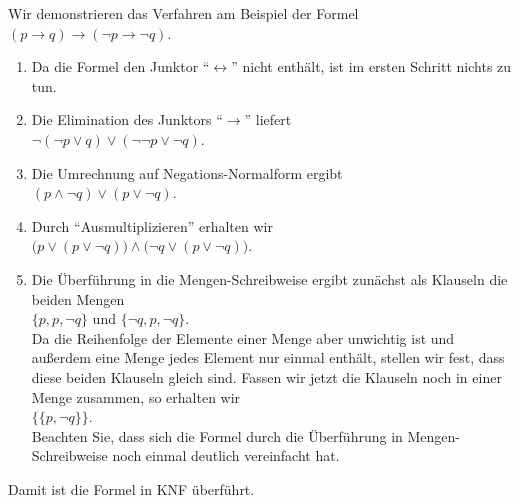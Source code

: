 Wir demonstrieren das Verfahren am Beispiel der Formel\\[0.2cm]
\hspace*{1.3cm} $(p \rightarrow q) \rightarrow (\neg p \rightarrow \neg q)$.
\begin{enumerate}
\item Da die Formel den Junktor ``$\leftrightarrow$'' nicht enthält,
      ist im ersten Schritt nichts zu tun.
\item Die Elimination des Junktors ``$\rightarrow$'' liefert \\[0.2cm]
      \hspace*{1.3cm} $\neg (\neg p \vee q) \vee (\neg \neg p \vee \neg q)$.
\item Die Umrechnung auf Negations-Normalform ergibt \\[0.2cm]
      \hspace*{1.3cm} $(p \wedge \neg q) \vee (p \vee \neg q)$.
\item Durch ``Ausmultiplizieren'' erhalten wir \\[0.2cm]
      \hspace*{1.3cm} $\bigl(p \vee (p \vee \neg q)\bigr) \wedge \bigl(\neg q \vee (p \vee \neg q)\bigr)$.
\item Die Überführung in die Mengen-Schreibweise ergibt zunächst als Klauseln die beiden Mengen \\[0.2cm]
      \hspace*{1.3cm} $\{p, p, \neg q\}$ \quad und \quad $\{\neg q,  p,  \neg q\}$. \\[0.2cm]
      Da die Reihenfolge der Elemente einer Menge aber unwichtig ist und außerdem eine Menge
      jedes Element nur einmal enthält, stellen wir fest, dass diese beiden Klauseln gleich sind.
      Fassen wir jetzt die Klauseln noch in einer Menge zusammen, so erhalten wir \\[0.2cm]
      \hspace*{1.3cm} $\bigl\{ \{p, \neg q\} \bigr\}$. \\[0.2cm]
      Beachten Sie, dass sich die Formel durch die Überführung in 
      Mengen-Schreibweise noch einmal deutlich vereinfacht hat.
\end{enumerate}
Damit ist die Formel in KNF überführt.

